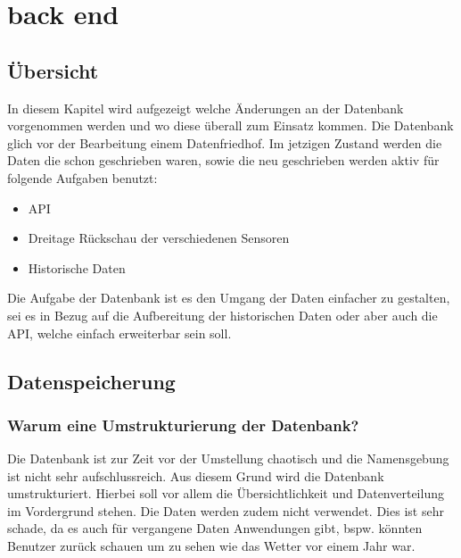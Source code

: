 \section{back end}


\subsection{Übersicht}

In diesem Kapitel wird aufgezeigt welche Änderungen an der Datenbank vorgenommen werden und wo diese überall zum Einsatz kommen. Die Datenbank glich vor der Bearbeitung einem Datenfriedhof. Im jetzigen Zustand werden die Daten die schon geschrieben waren, sowie die neu geschrieben werden aktiv für folgende Aufgaben benutzt:\\
\begin{itemize}
\item API
\item Dreitage Rückschau der verschiedenen Sensoren
\item Historische Daten
\end{itemize}

Die Aufgabe der Datenbank ist es den Umgang der Daten einfacher zu gestalten, sei es in Bezug auf die Aufbereitung der historischen Daten oder aber auch die API, welche einfach erweiterbar sein soll. 


\subsection{Datenspeicherung}
\subsubsection{Warum eine Umstrukturierung der Datenbank?}
Die Datenbank ist zur Zeit vor der Umstellung chaotisch und die Namensgebung ist nicht sehr aufschlussreich. Aus diesem Grund wird die Datenbank umstrukturiert. Hierbei soll vor allem die Übersichtlichkeit und Datenverteilung im Vordergrund stehen. Die Daten werden zudem nicht verwendet. Dies ist sehr schade, da es auch für vergangene Daten Anwendungen gibt, bspw. könnten Benutzer zurück schauen um zu sehen wie das Wetter vor einem Jahr war. 


